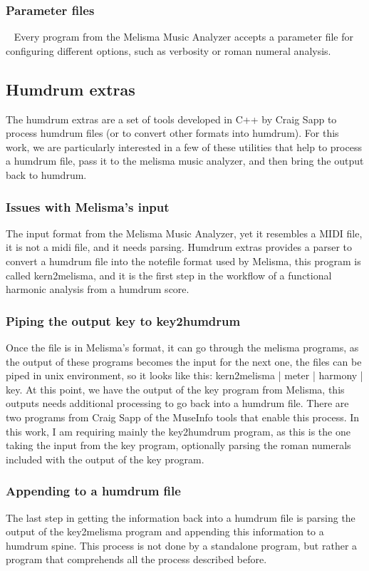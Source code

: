     \subsubsection{Parameter files}
    Every program from the Melisma Music Analyzer accepts a parameter file for configuring different options, such as verbosity or roman numeral analysis.
  \subsection{Humdrum extras}
  The humdrum extras are a set of tools developed in C++ by Craig Sapp to process humdrum files (or to convert other formats into humdrum). For this work, we are particularly interested in a few of these utilities that help to process a humdrum file, pass it to the melisma music analyzer, and then bring the output back to humdrum.
   	\subsubsection{Issues with Melisma's input}
    The input format from the Melisma Music Analyzer, yet it resembles a MIDI file, it is not a midi file, and it needs parsing. Humdrum extras provides a parser to convert a humdrum file into the notefile format used by Melisma, this program is called kern2melisma, and it is the first step in the workflow of a functional harmonic analysis from a humdrum score.
    \subsubsection{Piping the output key to key2humdrum}
    Once the file is in Melisma's format, it can go through the melisma programs, as the output of these programs becomes the input for the next one, the files can be piped in unix environment, so it looks like this: kern2melisma | meter | harmony | key.
    At this point, we have the output of the key program from Melisma, this outputs needs additional processing to go back into a humdrum file. There are two programs from Craig Sapp of the MuseInfo tools that enable this process. In this work, I am requiring mainly the key2humdrum program, as this is the one taking the input from the key program, optionally parsing the roman numerals included with the output of the key program.
    \subsubsection{Appending to a humdrum file}
    The last step in getting the information back into a humdrum file is parsing the output of the key2melisma program and appending this information to a humdrum spine. This process is not done by a standalone program, but rather a program that comprehends all the process described before.
